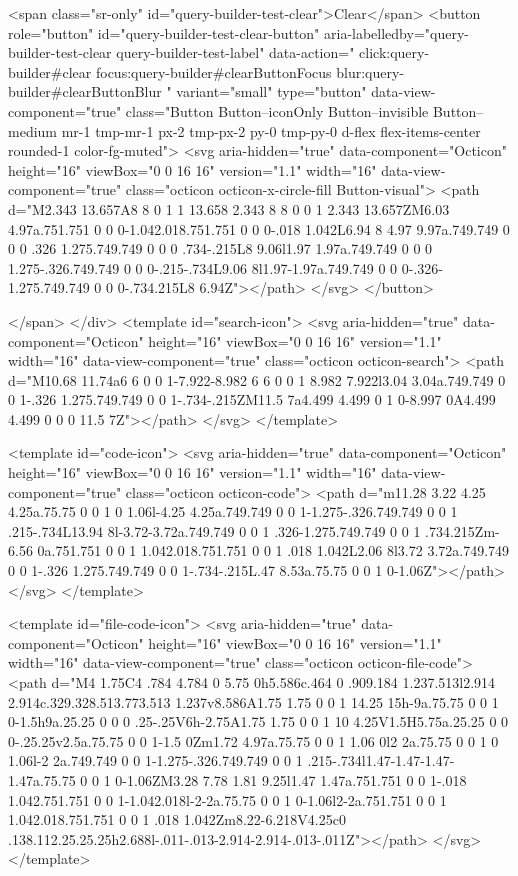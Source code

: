             <span class="sr-only" id="query-builder-test-clear">Clear</span>
            <button role="button" id="query-builder-test-clear-button" aria-labelledby="query-builder-test-clear query-builder-test-label" data-action="
                  click:query-builder#clear
                  focus:query-builder#clearButtonFocus
                  blur:query-builder#clearButtonBlur
                " variant="small" type="button" data-view-component="true" class="Button Button--iconOnly Button--invisible Button--medium mr-1 tmp-mr-1 px-2 tmp-px-2 py-0 tmp-py-0 d-flex flex-items-center rounded-1 color-fg-muted">  <svg aria-hidden="true" data-component="Octicon" height="16" viewBox="0 0 16 16" version="1.1" width="16" data-view-component="true" class="octicon octicon-x-circle-fill Button-visual">
    <path d="M2.343 13.657A8 8 0 1 1 13.658 2.343 8 8 0 0 1 2.343 13.657ZM6.03 4.97a.751.751 0 0 0-1.042.018.751.751 0 0 0-.018 1.042L6.94 8 4.97 9.97a.749.749 0 0 0 .326 1.275.749.749 0 0 0 .734-.215L8 9.06l1.97 1.97a.749.749 0 0 0 1.275-.326.749.749 0 0 0-.215-.734L9.06 8l1.97-1.97a.749.749 0 0 0-.326-1.275.749.749 0 0 0-.734.215L8 6.94Z"></path>
</svg>
</button>

          </span>
      </div>
      <template id="search-icon">
  <svg aria-hidden="true" data-component="Octicon" height="16" viewBox="0 0 16 16" version="1.1" width="16" data-view-component="true" class="octicon octicon-search">
    <path d="M10.68 11.74a6 6 0 0 1-7.922-8.982 6 6 0 0 1 8.982 7.922l3.04 3.04a.749.749 0 0 1-.326 1.275.749.749 0 0 1-.734-.215ZM11.5 7a4.499 4.499 0 1 0-8.997 0A4.499 4.499 0 0 0 11.5 7Z"></path>
</svg>
</template>

<template id="code-icon">
  <svg aria-hidden="true" data-component="Octicon" height="16" viewBox="0 0 16 16" version="1.1" width="16" data-view-component="true" class="octicon octicon-code">
    <path d="m11.28 3.22 4.25 4.25a.75.75 0 0 1 0 1.06l-4.25 4.25a.749.749 0 0 1-1.275-.326.749.749 0 0 1 .215-.734L13.94 8l-3.72-3.72a.749.749 0 0 1 .326-1.275.749.749 0 0 1 .734.215Zm-6.56 0a.751.751 0 0 1 1.042.018.751.751 0 0 1 .018 1.042L2.06 8l3.72 3.72a.749.749 0 0 1-.326 1.275.749.749 0 0 1-.734-.215L.47 8.53a.75.75 0 0 1 0-1.06Z"></path>
</svg>
</template>

<template id="file-code-icon">
  <svg aria-hidden="true" data-component="Octicon" height="16" viewBox="0 0 16 16" version="1.1" width="16" data-view-component="true" class="octicon octicon-file-code">
    <path d="M4 1.75C4 .784 4.784 0 5.75 0h5.586c.464 0 .909.184 1.237.513l2.914 2.914c.329.328.513.773.513 1.237v8.586A1.75 1.75 0 0 1 14.25 15h-9a.75.75 0 0 1 0-1.5h9a.25.25 0 0 0 .25-.25V6h-2.75A1.75 1.75 0 0 1 10 4.25V1.5H5.75a.25.25 0 0 0-.25.25v2.5a.75.75 0 0 1-1.5 0Zm1.72 4.97a.75.75 0 0 1 1.06 0l2 2a.75.75 0 0 1 0 1.06l-2 2a.749.749 0 0 1-1.275-.326.749.749 0 0 1 .215-.734l1.47-1.47-1.47-1.47a.75.75 0 0 1 0-1.06ZM3.28 7.78 1.81 9.25l1.47 1.47a.751.751 0 0 1-.018 1.042.751.751 0 0 1-1.042.018l-2-2a.75.75 0 0 1 0-1.06l2-2a.751.751 0 0 1 1.042.018.751.751 0 0 1 .018 1.042Zm8.22-6.218V4.25c0 .138.112.25.25.25h2.688l-.011-.013-2.914-2.914-.013-.011Z"></path>
</svg>
</template>

